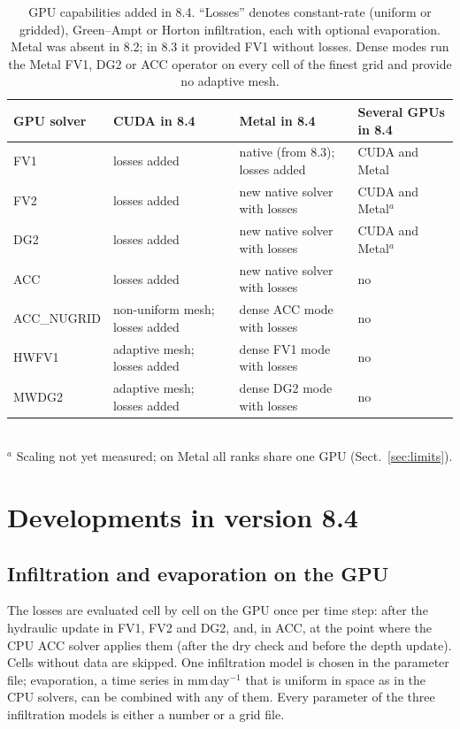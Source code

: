 \documentclass[preprint,12pt,authoryear]{elsarticle}
\begin{document}
\begin{table}[t]
\caption{GPU capabilities added in 8.4. ``Losses'' denotes constant-rate
(uniform or gridded), Green--Ampt or Horton infiltration, each with optional
evaporation. Metal was absent in 8.2; in 8.3 it provided FV1 without losses.
Dense modes run the Metal FV1, DG2 or ACC operator on every cell of the
finest grid and provide no adaptive mesh.}
\label{tab:support}
\centering\small
\begin{tabularx}{\textwidth}{@{}l>{\raggedright\arraybackslash}X>{\raggedright\arraybackslash}X>{\raggedright\arraybackslash}X@{}}
\toprule
GPU solver & CUDA in 8.4 & Metal in 8.4 & Several GPUs in 8.4 \\
\midrule
FV1 & losses added & native (from 8.3); losses added & CUDA and Metal \\
FV2 & losses added & new native solver with losses & CUDA and Metal$^{a}$ \\
DG2 & losses added & new native solver with losses & CUDA and Metal$^{a}$ \\
ACC & losses added & new native solver with losses & no \\
ACC\_NUGRID & non-uniform mesh; losses added & dense ACC mode with losses & no \\
HWFV1 & adaptive mesh; losses added & dense FV1 mode with losses & no \\
MWDG2 & adaptive mesh; losses added & dense DG2 mode with losses & no \\
\bottomrule
\end{tabularx}
\\[2pt]{\footnotesize $^{a}$ Scaling not yet measured; on Metal all ranks share one GPU (Sect.~\ref{sec:limits}).}
\end{table}

\section{Developments in version 8.4}\label{sec:developments}

\subsection{Infiltration and evaporation on the GPU}\label{sec:losses}

The losses are evaluated cell by cell on the GPU once per time step: after
the hydraulic update in FV1, FV2 and DG2, and, in ACC, at the point where the
CPU ACC solver applies them (after the dry check and before the depth
update). Cells without data are skipped. One infiltration model is chosen in
the parameter file; evaporation, a time series in mm\,day$^{-1}$ that is
uniform in space as in the CPU solvers, can be combined with any of them.
Every parameter of the three infiltration models is either a number or a grid
file.
\end{document}
